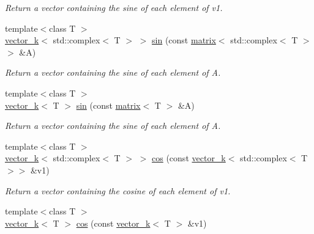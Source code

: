 \begin{DoxyCompactItemize}
\begin{DoxyCompactList}\small\item\em Return a vector containing the sine of each element of v1. \end{DoxyCompactList}\item 
\hypertarget{namespacekeycpp_a62fe1fbcb9ed4e33c5b31dc2c77bdbc4}{{\footnotesize template$<$class T $>$ }\\\hyperlink{classkeycpp_1_1vector__k}{vector\-\_\-k}$<$ std\-::complex$<$ T $>$ $>$ \hyperlink{namespacekeycpp_a62fe1fbcb9ed4e33c5b31dc2c77bdbc4}{sin} (const \hyperlink{classkeycpp_1_1matrix}{matrix}$<$ std\-::complex$<$ T $>$$>$ \&A)}\label{namespacekeycpp_a62fe1fbcb9ed4e33c5b31dc2c77bdbc4}

\begin{DoxyCompactList}\small\item\em Return a vector containing the sine of each element of A. \end{DoxyCompactList}\item 
\hypertarget{namespacekeycpp_ab89a85c0315b92a6844a77e352b5d50b}{{\footnotesize template$<$class T $>$ }\\\hyperlink{classkeycpp_1_1vector__k}{vector\-\_\-k}$<$ T $>$ \hyperlink{namespacekeycpp_ab89a85c0315b92a6844a77e352b5d50b}{sin} (const \hyperlink{classkeycpp_1_1matrix}{matrix}$<$ T $>$ \&A)}\label{namespacekeycpp_ab89a85c0315b92a6844a77e352b5d50b}

\begin{DoxyCompactList}\small\item\em Return a vector containing the sine of each element of A. \end{DoxyCompactList}\item 
\hypertarget{namespacekeycpp_a917607e20e487553be913b7ccaa4736d}{{\footnotesize template$<$class T $>$ }\\\hyperlink{classkeycpp_1_1vector__k}{vector\-\_\-k}$<$ std\-::complex$<$ T $>$ $>$ \hyperlink{namespacekeycpp_a917607e20e487553be913b7ccaa4736d}{cos} (const \hyperlink{classkeycpp_1_1vector__k}{vector\-\_\-k}$<$ std\-::complex$<$ T $>$$>$ \&v1)}\label{namespacekeycpp_a917607e20e487553be913b7ccaa4736d}

\begin{DoxyCompactList}\small\item\em Return a vector containing the cosine of each element of v1. \end{DoxyCompactList}\item 
\hypertarget{namespacekeycpp_a1d9cd34e13780fffeb1de19287f5636d}{{\footnotesize template$<$class T $>$ }\\\hyperlink{classkeycpp_1_1vector__k}{vector\-\_\-k}$<$ T $>$ \hyperlink{namespacekeycpp_a1d9cd34e13780fffeb1de19287f5636d}{cos} (const \hyperlink{classkeycpp_1_1vector__k}{vector\-\_\-k}$<$ T $>$ \&v1)}\label{namespacekeycpp_a1d9cd34e13780fffeb1de19287f5636d}


\end{DoxyCompactItemize}
